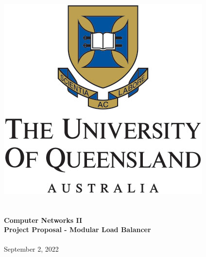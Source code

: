 \begin{titlepage}
\center
\includegraphics[scale=0.4]{img/uq-logo.jpg} \\[1.5cm]
\HRule \\[0.4cm]
{ \Huge \bfseries \coursecode \\ Computer Networks II \ \\[0.25cm] 
\huge Project Proposal - Modular Load Balancer} \\[0.4cm]
\HRule \\[1.5cm]
\theauthor
September 2, 2022 \\ [1cm]
\restoregeometry
\end{titlepage}